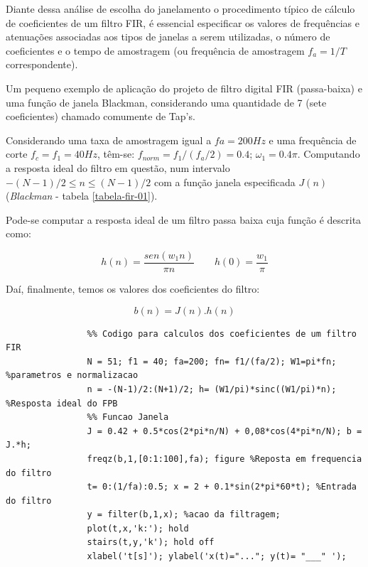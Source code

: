 		Diante dessa análise de escolha do janelamento o procedimento típico de cálculo de coeficientes de um filtro FIR, é essencial especificar os valores de frequências e atenuações associadas aos tipos de janelas a serem utilizadas, o número de coeficientes e o tempo de amostragem (ou frequência de amostragem $ f_a = 1/T $ correspondente).
		
		\begin{exem}
			\label{exemplo-fir-01}
			Um pequeno exemplo de aplicação do projeto de filtro digital FIR (passa-baixa) e uma função de janela Blackman, considerando uma quantidade de 7 (sete coeficientes) chamado comumente de Tap's.
			
			Considerando uma taxa de amostragem igual a $fa= 200 Hz$ e uma frequência de corte $ f_c = f_1 = 40 Hz $, têm-se: $ f_{norm} = f_1/(f_a/2) = 0.4 $; $ \omega_1 = 0.4\pi $. Computando a resposta ideal do filtro em questão, num intervalo $-(N-1)/2 \leq n \leq (N-1)/2$ com a função janela especificada $J(n)$ (\textit{Blackman} - tabela \ref{tabela-fir-01}).
			
			
			Pode-se computar a resposta ideal de um filtro passa baixa cuja função é descrita como:
			
			\begin{equation}
			\label{eq-passa-baixa-fir}
			h(n) = \frac{sen(w_1 n)}{\pi n}
			\qquad
			h(0) = \frac{w_1}{\pi}
			\end{equation}
			
			Daí, finalmente, temos os valores dos coeficientes do filtro:
			
			\[b(n) = J(n).h(n)\]
			
			\begin{lstlisting}
				%% Codigo para calculos dos coeficientes de um filtro FIR
				N = 51; f1 = 40; fa=200; fn= f1/(fa/2); W1=pi*fn; %parametros e normalizacao
				n = -(N-1)/2:(N+1)/2; h= (W1/pi)*sinc((W1/pi)*n); %Resposta ideal do FPB
				%% Funcao Janela
				J = 0.42 + 0.5*cos(2*pi*n/N) + 0,08*cos(4*pi*n/N); b = J.*h;
				freqz(b,1,[0:1:100],fa); figure %Reposta em frequencia do filtro
				t= 0:(1/fa):0.5; x = 2 + 0.1*sin(2*pi*60*t); %Entrada do filtro
				y = filter(b,1,x); %acao da filtragem;
				plot(t,x,'k:'); hold
				stairs(t,y,'k'); hold off
				xlabel('t[s]'); ylabel('x(t)="..."; y(t)= "___" ');
			\end{lstlisting}
			
		\end{exem}
		
